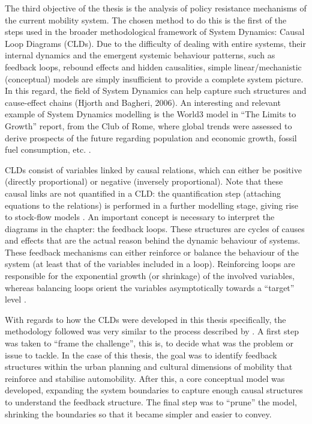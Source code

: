 The third objective of the thesis is the analysis of policy resistance mechanisms of the current mobility system. The chosen method to do this is the first of the steps used in the broader methodological framework of System Dynamics: Causal Loop Diagrams (CLDs). Due to the difficulty of dealing with entire systems, their internal dynamics and the emergent systemic behaviour patterns, such as feedback loops, rebound effects and hidden causalities, simple linear/mechanistic (conceptual) models are simply insufficient to provide a complete system picture. In this regard, the field of System Dynamics can help capture such structures and cause-effect chains (Hjorth and Bagheri, 2006). An interesting and relevant example of System Dynamics modelling is the World3 model in ``The Limits to Growth'' report, from the Club of Rome, where global trends were assessed to derive prospects of the future regarding population and economic growth, fossil fuel consumption, etc. \parencite{meadows1972_LimitsGrowthReport}.

CLDs consist of variables linked by causal relations, which can either be positive (directly proportional) or negative (inversely proportional). Note that these causal links are not quantified in a CLD: the quantification step (attaching equations to the relations) is performed in a further modelling stage, giving rise to stock-flow models \parencite{sterman2000_BusinessDynamics}. An important concept is necessary to interpret the diagrams in the  chapter: the feedback loops. These structures are cycles of causes and effects that are the actual reason behind the dynamic behaviour of systems. These feedback mechanisms can either reinforce or balance the behaviour of the system (at least that of the variables included in a loop). Reinforcing loops are responsible for the exponential growth (or shrinkage) of the involved variables, whereas balancing loops orient the variables asymptotically towards a ``target'' level \parencite{sterman2000_BusinessDynamics}.

With regards to how the CLDs were developed in this thesis specifically, the methodology followed was very similar to the process described by \textcite{laurenti2015_TowardsAddressingUnintended}. A first step was taken to ``frame the challenge'', this is, to decide what was the problem or issue to tackle. In the case of this thesis, the goal was to identify feedback structures within the urban planning and cultural dimensions of mobility that reinforce and stabilise automobility. After this, a core conceptual model was developed, expanding the system boundaries to capture enough causal structures to understand the feedback structure. The final step was to ``prune'' the model, shrinking the boundaries so that it became simpler and easier to convey.

